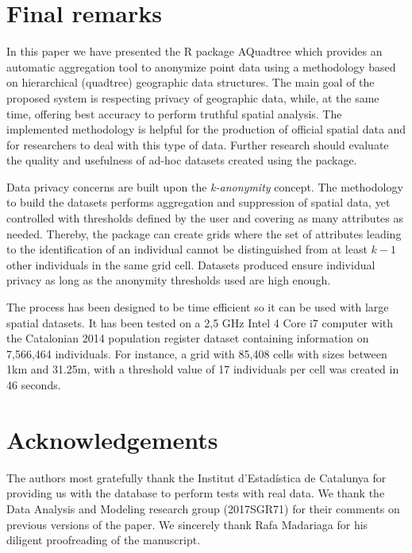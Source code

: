 \section{Final remarks} \label{sec:final}

In this paper we have presented the R package AQuadtree which provides an automatic aggregation tool to anonymize point data using a methodology based on hierarchical (quadtree) geographic data structures. The main goal of the proposed system is respecting privacy of geographic data, while, at the same time, offering best accuracy to perform truthful spatial analysis. The implemented methodology is helpful for the production of official spatial data and for researchers to deal with this type of data. Further research should evaluate the quality and usefulness of ad-hoc datasets created using the package. 

Data privacy concerns are built upon the \emph{k-anonymity} concept. The methodology to build the datasets performs aggregation and suppression of spatial data, yet controlled with thresholds defined by the user and covering as many attributes as needed. Thereby, the package can create grids where the set of attributes leading to the identification of an individual cannot be distinguished from at least $k-1$ other individuals in the same grid cell. Datasets produced ensure individual privacy as long as the anonymity thresholds used are high enough.

The process has been designed to be time efficient so it can be used with large spatial datasets. It has been tested on a 2,5 GHz Intel 4 Core i7 computer with the Catalonian 2014 population register dataset containing information on 7,566,464 individuals. For instance, a grid with 85,408 cells with sizes between 1km and 31.25m, with a threshold value of 17 individuals per cell was created in 46 seconds.


\section{Acknowledgements}

The authors most gratefully thank the Institut d'Estadística de Catalunya for providing us with the database to perform tests with real data. We thank the Data Analysis and Modeling research group (2017SGR71) for their comments on previous versions of the paper. We sincerely thank Rafa Madariaga for his diligent proofreading of the manuscript.


